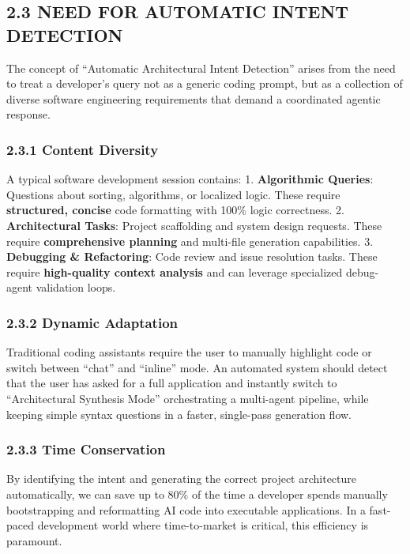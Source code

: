\documentclass[
  12pt,
]{article}
\begin{document}
\subsection{2.3 NEED FOR AUTOMATIC INTENT
DETECTION}\label{need-for-automatic-intent-detection}

The concept of ``Automatic Architectural Intent Detection'' arises from
the need to treat a developer's query not as a generic coding prompt,
but as a collection of diverse software engineering requirements that
demand a coordinated agentic response.

\subsubsection{2.3.1 Content Diversity}\label{content-diversity}

A typical software development session contains: 1. \textbf{Algorithmic
Queries}: Questions about sorting, algorithms, or localized logic. These
require \textbf{structured, concise} code formatting with 100\% logic
correctness. 2. \textbf{Architectural Tasks}: Project scaffolding and
system design requests. These require \textbf{comprehensive planning}
and multi-file generation capabilities. 3. \textbf{Debugging \&
Refactoring}: Code review and issue resolution tasks. These require
\textbf{high-quality context analysis} and can leverage specialized
debug-agent validation loops.

\subsubsection{2.3.2 Dynamic Adaptation}\label{dynamic-adaptation}

Traditional coding assistants require the user to manually highlight
code or switch between ``chat'' and ``inline'' mode. An automated system
should detect that the user has asked for a full application and
instantly switch to ``Architectural Synthesis Mode'' orchestrating a
multi-agent pipeline, while keeping simple syntax questions in a faster,
single-pass generation flow.

\subsubsection{2.3.3 Time Conservation}\label{time-conservation}

By identifying the intent and generating the correct project
architecture automatically, we can save up to 80\% of the time a
developer spends manually bootstrapping and reformatting AI code into
executable applications. In a fast-paced development world where
time-to-market is critical, this efficiency is paramount.
\end{document}
